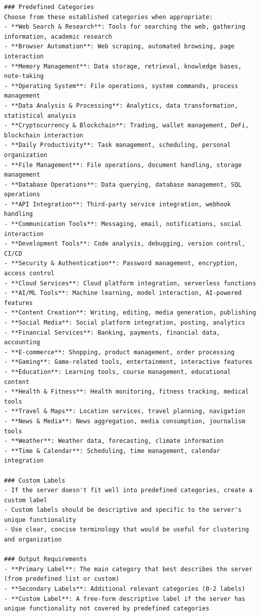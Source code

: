 \begin{verbatim}
### Predefined Categories
Choose from these established categories when appropriate:
- **Web Search & Research**: Tools for searching the web, gathering information, academic research
- **Browser Automation**: Web scraping, automated browsing, page interaction
- **Memory Management**: Data storage, retrieval, knowledge bases, note-taking
- **Operating System**: File operations, system commands, process management
- **Data Analysis & Processing**: Analytics, data transformation, statistical analysis
- **Cryptocurrency & Blockchain**: Trading, wallet management, DeFi, blockchain interaction
- **Daily Productivity**: Task management, scheduling, personal organization
- **File Management**: File operations, document handling, storage management
- **Database Operations**: Data querying, database management, SQL operations
- **API Integration**: Third-party service integration, webhook handling
- **Communication Tools**: Messaging, email, notifications, social interaction
- **Development Tools**: Code analysis, debugging, version control, CI/CD
- **Security & Authentication**: Password management, encryption, access control
- **Cloud Services**: Cloud platform integration, serverless functions
- **AI/ML Tools**: Machine learning, model interaction, AI-powered features
- **Content Creation**: Writing, editing, media generation, publishing
- **Social Media**: Social platform integration, posting, analytics
- **Financial Services**: Banking, payments, financial data, accounting
- **E-commerce**: Shopping, product management, order processing
- **Gaming**: Game-related tools, entertainment, interactive features
- **Education**: Learning tools, course management, educational content
- **Health & Fitness**: Health monitoring, fitness tracking, medical tools
- **Travel & Maps**: Location services, travel planning, navigation
- **News & Media**: News aggregation, media consumption, journalism tools
- **Weather**: Weather data, forecasting, climate information
- **Time & Calendar**: Scheduling, time management, calendar integration

### Custom Labels
- If the server doesn't fit well into predefined categories, create a custom label
- Custom labels should be descriptive and specific to the server's unique functionality
- Use clear, concise terminology that would be useful for clustering and organization

### Output Requirements
- **Primary Label**: The main category that best describes the server (from predefined list or custom)
- **Secondary Labels**: Additional relevant categories (0-2 labels)
- **Custom Label**: A free-form descriptive label if the server has unique functionality not covered by predefined categories


\end{verbatim}
